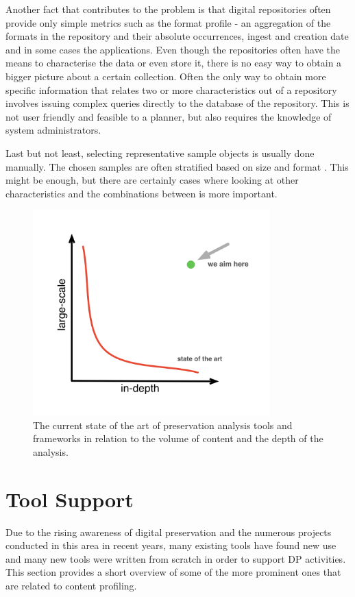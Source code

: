 Another fact that contributes to the problem is that digital repositories often provide only simple metrics such as the format profile - an aggregation of the formats in the repository and their absolute occurrences, ingest and creation date and in some cases the applications. Even though the repositories often have the means to characterise the data or even store it, there is no easy way to obtain a bigger picture about a certain collection.
Often the only way to obtain more specific information that relates two or more characteristics out of a repository involves
issuing complex queries directly to the database of the repository. This is not user friendly and feasible to a planner, but also requires the knowledge of system administrators.

Last but not least, selecting representative sample objects is usually done manually. The chosen samples are often stratified based on size and format \cite{journals/dlib/KulovitsRKBBS09}. This might be enough, but there are certainly cases where looking at other characteristics and the combinations between is more important.

\begin{figure}[th]
\begin{center}
\includegraphics[width=3.6in]{figures/related/sota_analysis.png}
\caption{The current state of the art of preservation analysis tools and frameworks in relation to the volume of content and the depth of the analysis.}
\label{fig:sota_analysis}
\end{center}
\end{figure}

\section{Tool Support}
\label{lbl:tool_support}
Due to the rising awareness of digital preservation and the numerous projects conducted in this area in recent years, many existing tools have found new use and many new tools were written from scratch in order to support DP activities. This section provides a short overview of some of the more prominent ones that are related to content profiling.

